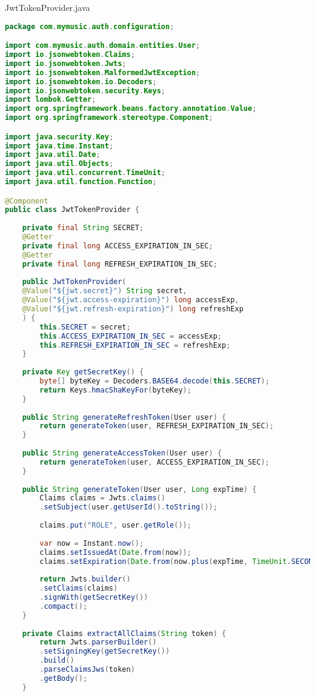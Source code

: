 JwtTokenProvider.java
\begin{lstlisting}[language=java]
package com.mymusic.auth.configuration;

import com.mymusic.auth.domain.entities.User;
import io.jsonwebtoken.Claims;
import io.jsonwebtoken.Jwts;
import io.jsonwebtoken.MalformedJwtException;
import io.jsonwebtoken.io.Decoders;
import io.jsonwebtoken.security.Keys;
import lombok.Getter;
import org.springframework.beans.factory.annotation.Value;
import org.springframework.stereotype.Component;

import java.security.Key;
import java.time.Instant;
import java.util.Date;
import java.util.Objects;
import java.util.concurrent.TimeUnit;
import java.util.function.Function;

@Component
public class JwtTokenProvider {
	
	private final String SECRET;
	@Getter
	private final long ACCESS_EXPIRATION_IN_SEC;
	@Getter
	private final long REFRESH_EXPIRATION_IN_SEC;
	
	public JwtTokenProvider(
	@Value("${jwt.secret}") String secret,
	@Value("${jwt.access-expiration}") long accessExp,
	@Value("${jwt.refresh-expiration}") long refreshExp
	) {
		this.SECRET = secret;
		this.ACCESS_EXPIRATION_IN_SEC = accessExp;
		this.REFRESH_EXPIRATION_IN_SEC = refreshExp;
	}
	
	private Key getSecretKey() {
		byte[] byteKey = Decoders.BASE64.decode(this.SECRET);
		return Keys.hmacShaKeyFor(byteKey);
	}
	
	public String generateRefreshToken(User user) {
		return generateToken(user, REFRESH_EXPIRATION_IN_SEC);
	}
	
	public String generateAccessToken(User user) {
		return generateToken(user, ACCESS_EXPIRATION_IN_SEC);
	}
	
	public String generateToken(User user, Long expTime) {
		Claims claims = Jwts.claims()
		.setSubject(user.getUserId().toString());
		
		claims.put("ROLE", user.getRole());
		
		var now = Instant.now();
		claims.setIssuedAt(Date.from(now));
		claims.setExpiration(Date.from(now.plus(expTime, TimeUnit.SECONDS.toChronoUnit())));
		
		return Jwts.builder()
		.setClaims(claims)
		.signWith(getSecretKey())
		.compact();
	}
	
	private Claims extractAllClaims(String token) {
		return Jwts.parserBuilder()
		.setSigningKey(getSecretKey())
		.build()
		.parseClaimsJws(token)
		.getBody();
	}
	

\end{lstlisting}
